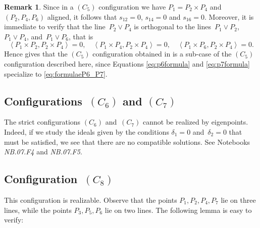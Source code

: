 \documentclass[a4paper, 11pt, reqno]{amsart}
\theoremstyle{plain}
\theoremstyle{definition}
\newtheorem{rmk}[lemma]{Remark}
\newcommand{\nb}[2]{\textsl{{NB}.{#1}.{#2}}}
\newcommand{\scl}[2]{\left\langle {#1}, {#2} \right\rangle}
\begin{document}
\begin{rmk}
\label{remark:C5rk8}
Since in a $(C_5)$ configuration we have 
$P_1 = P_2 \times P_4$ and $(P_2, P_4, P_6)$ aligned, it follows that $s_{12} = 0$, $s_{14} = 0$ and $s_{16} = 0$.
Moreover, it is
immediate to verify that the line~$P_2 \vee P_4$ is orthogonal to the
lines~$P_1 \vee P_2$, $P_1 \vee P_4$, and~$P_1 \vee P_6$, that is
%
\[
  \scl{P_1 \times P_2}{P_2 \times P_4} = 0, \quad
  \scl{P_1 \times P_4}{P_2 \times P_4} = 0, \quad
  \scl{P_1 \times P_6}{P_2 \times P_4} = 0.
\]
Hence  gives that the $(C_5)$ configuration obtained in  is a sub-case of the $(C_5)$ configuration described here, since Equations \eqref{eq:p6formula} and \eqref{eq:p7formula} specialize to \eqref{eq:formulaeP6_P7}.
%
\end{rmk}
%

\subsection*{Configurations~\texorpdfstring{$(C_6)$}{C6} and \texorpdfstring{$(C_7)$}{C7}}

The strict configurations $(C_6)$ and~$(C_7)$ cannot be realized by eigenpoints.
Indeed, if we study the ideals given by the conditions
$\delta_1=0$ and~$\delta_2=0$ that must be satisfied,
we see that there are no compatible solutions.
See Notebooks \nb{07}{F4} and \nb{07}{F5}.

\subsection*{Configuration~\texorpdfstring{$(C_8)$}{C8}}
This configuration is realizable.  
%
%
Observe that the points $P_1, P_2, P_4, P_7$ lie on three lines, while the points
$P_3, P_5, P_6$ lie on two lines.
The following lemma is easy to verify:
\end{document}
